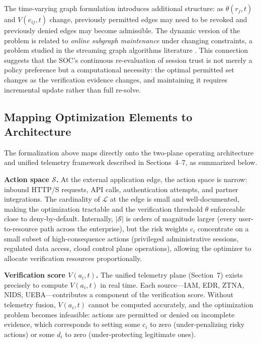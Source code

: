 \documentclass[acmlarge]{acmart}
\begin{document}
The time-varying graph formulation introduces additional structure: as $\theta(r_j, t)$
and $V(e_{ij}, t)$ change, previously permitted edges may need to be revoked and
previously denied edges may become admissible. The dynamic version of the problem
is related to \textit{online subgraph maintenance} under changing constraints, a
problem studied in the streaming graph algorithms literature
\cite{mcgregor2014streaming}. This connection suggests that the SOC's continuous
re-evaluation of session trust is not merely a policy preference but a computational
necessity: the optimal permitted set changes as the verification evidence changes,
and maintaining it requires incremental update rather than full re-solve.

\subsection{Mapping Optimization Elements to Architecture}
\label{sec:theory_mapping}

The formalization above maps directly onto the two-plane operating architecture and
unified telemetry framework described in Sections~4--7, as summarized below.

\textbf{Action space $\mathcal{S}$.} At the external application edge, the action
space is narrow: inbound HTTP/S requests, API calls, authentication attempts, and
partner integrations. The cardinality of $\mathcal{L}$ at the edge is small and
well-documented, making the optimization tractable and the verification threshold
$\theta$ enforceable close to deny-by-default. Internally, $|\mathcal{S}|$ is
orders of magnitude larger (every user-to-resource path across the enterprise),
but the risk weights $c_i$ concentrate on a small subset of high-consequence actions
(privileged administrative sessions, regulated data access, cloud control plane
operations), allowing the optimizer to allocate verification resources
proportionally.

\textbf{Verification score $V(a_i, t)$.} The unified telemetry plane (Section~7)
exists precisely to compute $V(a_i, t)$ in real time. Each source---IAM, EDR,
ZTNA, NIDS, UEBA---contributes a component of the verification score. Without
telemetry fusion, $V(a_i, t)$ cannot be computed accurately, and the optimization
problem becomes infeasible: actions are permitted or denied on incomplete evidence,
which corresponds to setting some $c_i$ to zero (under-penalizing risky actions)
or some $d_i$ to zero (under-protecting legitimate ones).
\end{document}
